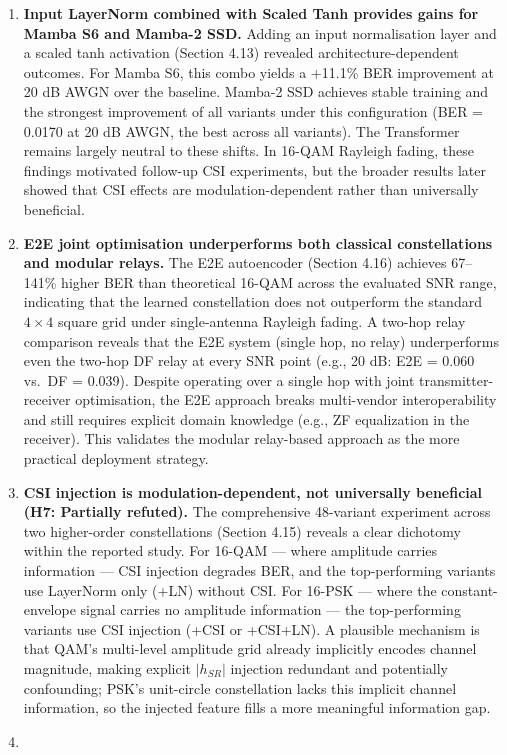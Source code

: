 \documentclass[
  english,
  12pt,
  12pt,
  a4paper,
  oneside]{report}
\begin{document}
\begin{enumerate}
\item
  \textbf{Input LayerNorm combined with Scaled Tanh provides gains for Mamba S6 and Mamba-2 SSD.} Adding an input normalisation layer and a scaled tanh activation (Section 4.13) revealed architecture-dependent outcomes. For Mamba S6, this combo yields a +11.1\% BER improvement at 20 dB AWGN over the baseline. Mamba-2 SSD achieves stable training and the strongest improvement of all variants under this configuration (BER = 0.0170 at 20 dB AWGN, the best across all variants). The Transformer remains largely neutral to these shifts. In 16-QAM Rayleigh fading, these findings motivated follow-up CSI experiments, but the broader results later showed that CSI effects are modulation-dependent rather than universally beneficial.
\item
  \textbf{E2E joint optimisation underperforms both classical constellations and modular relays.} The E2E autoencoder (Section 4.16) achieves 67--141\% higher BER than theoretical 16-QAM across the evaluated SNR range, indicating that the learned constellation does not outperform the standard \(4 \times 4\) square grid under single-antenna Rayleigh fading. A two-hop relay comparison reveals that the E2E system (single hop, no relay) underperforms even the two-hop DF relay at every SNR point (e.g., 20 dB: E2E = 0.060 vs.~DF = 0.039). Despite operating over a single hop with joint transmitter-receiver optimisation, the E2E approach breaks multi-vendor interoperability and still requires explicit domain knowledge (e.g., ZF equalization in the receiver). This validates the modular relay-based approach as the more practical deployment strategy.
\item
  \textbf{CSI injection is modulation-dependent, not universally beneficial (H7: Partially refuted).} The comprehensive 48-variant experiment across two higher-order constellations (Section 4.15) reveals a clear dichotomy within the reported study. For 16-QAM --- where amplitude carries information --- CSI injection degrades BER, and the top-performing variants use LayerNorm only (+LN) without CSI. For 16-PSK --- where the constant-envelope signal carries no amplitude information --- the top-performing variants use CSI injection (+CSI or +CSI+LN). A plausible mechanism is that QAM's multi-level amplitude grid already implicitly encodes channel magnitude, making explicit \(|h_{SR}|\) injection redundant and potentially confounding; PSK's unit-circle constellation lacks this implicit channel information, so the injected feature fills a more meaningful information gap.
\item

\end{enumerate}
\end{document}
